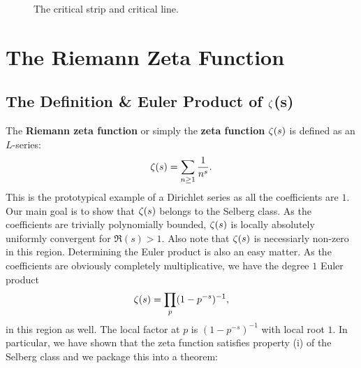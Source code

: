       \begin{figure}[ht]
        \centering
        \caption{The critical strip and critical line.}
        \label{fig:critical_strip}
      \end{figure}
  \section{The Riemann Zeta Function}\label{sec:The_Riemann_Zeta_Function}
    \subsection*{The Definition \& Euler Product of \texorpdfstring{$\zeta$}{\z}(s)}
      The \textbf{Riemann zeta function} or simply the \textbf{zeta function} $\zeta(s)$ is defined as an $L$-series:
      \[
        \zeta(s) = \sum_{n \ge 1}\frac{1}{n^{s}}.
      \]
      This is the prototypical example of a Dirichlet series as all the coefficients are $1$. Our main goal is to show that $\zeta(s)$ belongs to the Selberg class. As the coefficients are trivially polynomially bounded, $\zeta(s)$ is locally absolutely uniformly convergent for $\Re(s) > 1$. Also note that $\zeta(s)$ is necessiarly non-zero in this region. Determining the Euler product is also an easy matter. As the coefficients are obviously completely multiplicative, we have the degree $1$ Euler product
      \[
        \zeta(s) = \prod_{p}(1-p^{-s})^{-1},
      \]
      in this region as well. The local factor at $p$ is $(1-p^{-s})^{-1}$ with local root $1$. In particular, we have shown that the zeta function satisfies property (i) of the Selberg class and we package this into a theorem:

